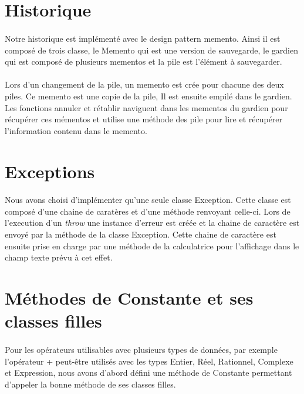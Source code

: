 \documentclass[a4paper,11pt]{report}
\begin{document}
	\section{Historique}
		\paragraph{}Notre historique est implémenté avec le design pattern memento. Ainsi il est composé de trois classe, le Memento qui est une version de sauvegarde, le gardien qui est composé de plusieurs mementos et la pile est l'élément à sauvegarder. 
		
		 \paragraph{}Lors d’un changement de la pile, un memento est crée pour chacune des deux piles. Ce memento est une copie de la pile, Il est ensuite empilé dans le gardien. Les fonctions annuler et rétablir naviguent dans les mementos du gardien pour récupérer ces mémentos et utilise une méthode des pile pour lire et récupérer l'information contenu dans le memento.
		 
	\section{Exceptions}
		\paragraph{}Nous avons choisi d'implémenter qu'une seule classe Exception. Cette classe est composé d'une chaine de caratères et d'une méthode renvoyant celle-ci. Lors de l'execution d'un \emph{throw} une instance d'erreur est créée et la chaine de caractère est envoyé par la méthode de la classe Exception. Cette chaine de caractère est ensuite prise en charge par une méthode de la calculatrice pour l'affichage dans le champ texte prévu à cet effet.
		
	\section{Méthodes de Constante et ses classes filles}
		\paragraph{}Pour les opérateurs utilisables avec plusieurs types de données, par exemple l'opérateur + peut-être utilisés avec les types Entier, Réel, Rationnel, Complexe et Expression, nous avons d'abord défini une méthode de Constante permettant d'appeler la bonne méthode de ses classes filles.
\end{document}

